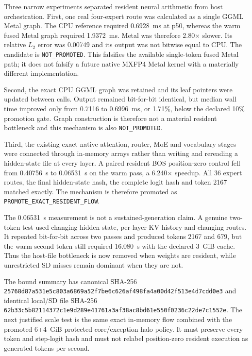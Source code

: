 Three narrow experiments separated resident neural arithmetic from host
orchestration.  First, one real four-expert route was calculated as a single
GGML Metal graph.  The CPU reference required 0.6928~ms at p50, whereas the
warm fused Metal graph required 1.9372~ms.  Metal was therefore 2.80$\times$
slower.  Its relative $L_2$ error was 0.00749 and its output was not bitwise
equal to CPU.  The candidate is \texttt{NOT\_PROMOTED}.  This falsifies the
available single-token fused Metal path; it does not falsify a future native
MXFP4 Metal kernel with a materially different implementation.

Second, the exact CPU GGML graph was retained and its leaf pointers were
updated between calls.  Output remained bit-for-bit identical, but median wall
time improved only from 0.7116 to 0.6996~ms, or 1.71\%, below the declared
10\% promotion gate.  Graph construction is therefore not a material resident
bottleneck and this mechanism is also \texttt{NOT\_PROMOTED}.

Third, the existing exact native attention, router, MoE and vocabulary stages
were connected through in-memory arrays rather than writing and rereading a
hidden-state file at every layer.  A paired resident BOS position-zero control
fell from 0.40756~s to 0.06531~s on the warm pass, a 6.240$\times$ speedup.
All 36 expert routes, the final hidden-state hash, the complete logit hash and
token 2167 matched exactly.  The mechanism is therefore promoted as
\texttt{PROMOTE\_EXACT\_RESIDENT\_FLOW}.

The 0.06531~s measurement is not a sustained-generation claim.  A genuine
two-token test used changing hidden state, per-layer KV history and changing
routes.  It repeated bit-for-bit across two passes and produced tokens 2167
and 679, but the warm second token still required 16.080~s with the declared
3~GiB cache.  Thus the host-file bottleneck is now removed when weights are
resident, while unrestricted SD misses remain dominant when they are not.

The bound summary has canonical SHA-256
\texttt{25768d87a531e5c803a6869a52f7be6c626af498fa4a00d42f513e4d7cdd0e3}
and identical local/SD file SHA-256
\texttt{62b33c5b82114372c1e9d289e41761a3af38ac8bd61e550f0236c22de7c1552e}.
The next justified scale test is the same exact in-memory flow combined with
the promoted 6+4~GiB protected-core/exception-halo policy.  It must preserve
every token and step-logit hash and must not relabel position-zero resident
execution as generated tokens per second.

